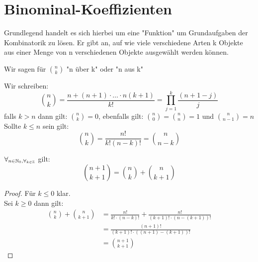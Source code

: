 \section{Binominal-Koeffizienten}
Grundlegend handelt es sich hierbei um eine "Funktion" um Grundaufgaben der Kombinatorik zu lösen. Er gibt an, auf wie viele verschiedene Arten k Objekte aus einer Menge von n verschiedenen Objekte ausgewählt werden können.

\begin{notation}
Wir sagen für ${n \choose k}$ "n über k" oder "n aus k"
\end{notation}
\begin{definition}
Wir schreiben:
\[
{n \choose k} = \frac{n+(n+1)\cdot \ldots \cdot n(k+1)}{k!}= \prod_{j=1}^{k} \frac{(n+1-j)}{j}  
\]
falls $k>n$ dann gilt: ${n \choose k}=0$, ebenfalls gilt: ${n \choose 0} = {n \choose n} =1$ und ${n \choose n-1} = n$ \\
Sollte $k\le n$ sein gilt:
\[
{n \choose k} = \frac{n!}{k! (n-k)!} = {n \choose n-k}
\]
\end{definition}
\begin{lemma}
	$\forall_{n \in \mathbb{N}_0, \forall_{k \in \mathbb{Z}} }$  gilt:
	\[
	{n+1 \choose k+1} = {n \choose k} + {n \choose k+1}
	\]
\end{lemma}
\begin{proof}
Für $k\le  0$ klar. \\
Sei $k\ge 0$ dann gilt:
\begin{align*}
	{n \choose k} + {n \choose k+1} &= \frac{n!}{k! \cdot (n-k)!}+ \frac{n!}{(k+1)!\cdot (n-(k+1))!} \\
					&= \frac{(n+1)!}{(k+1)! \cdot ((n+1)-(k+1))!}\\
					&= {n+1 \choose k+1}
\end{align*}
\end{proof}
